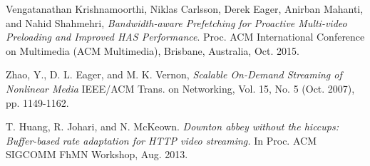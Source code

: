 \documentclass[9pt,a4paper]{acmproc}
\begin{document}
\begin{thebibliography}{9}
Vengatanathan Krishnamoorthi, Niklas Carlsson, Derek Eager, Anirban 
Mahanti, and Nahid Shahmehri,
	\emph{Bandwidth-aware Prefetching for Proactive 
Multi-video Preloading and Improved HAS Performance}.
	\newline
	Proc. ACM 
International Conference on Multimedia (ACM Multimedia), Brisbane, 
Australia, Oct. 2015.

Zhao, Y., D. L. Eager, and M. K. Vernon,
	\emph{Scalable On-Demand Streaming of 
Nonlinear Media}
	\newline
	 IEEE/ACM Trans. on Networking, Vol. 15, No. 5 (Oct. 
2007), pp. 1149-1162.

T. Huang, R. Johari, and N. McKeown.
	\emph{ Downton abbey without the hiccups: Buffer-based rate adaptation for HTTP video streaming.}
	\newline
	 In Proc. ACM SIGCOMM FhMN
Workshop, Aug. 2013.





\end{thebibliography}

\thispagestyle{empty}
\end{document}
